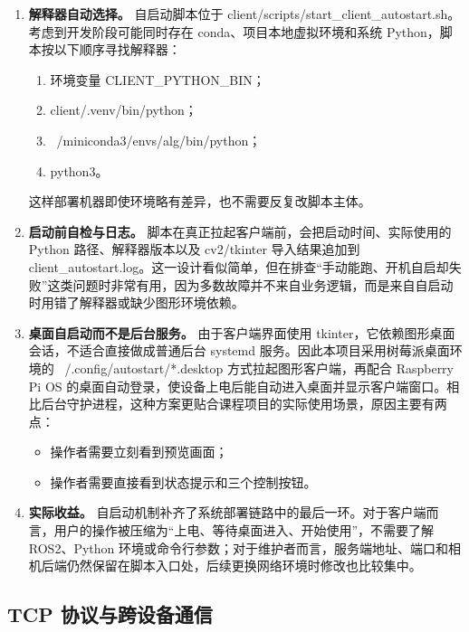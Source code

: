 \documentclass[12pt]{article}
\newcommand{\code}[1]{{\ttfamily #1}}
\begin{document}
\begin{enumerate}
	\item \textbf{解释器自动选择。} 自启动脚本位于 \code{client/scripts/start\_client\_autostart.sh}。考虑到开发阶段可能同时存在 conda、项目本地虚拟环境和系统 Python，脚本按以下顺序寻找解释器：

	      \begin{enumerate}
		      \item 环境变量 \code{CLIENT\_PYTHON\_BIN}；
		      \item \code{client/.venv/bin/python}；
		      \item \code{~/miniconda3/envs/alg/bin/python}；
		      \item \code{python3}。
	      \end{enumerate}

	      这样部署机器即使环境略有差异，也不需要反复改脚本主体。

	\item \textbf{启动前自检与日志。} 脚本在真正拉起客户端前，会把启动时间、实际使用的 Python 路径、解释器版本以及 \code{cv2}/\code{tkinter} 导入结果追加到 \code{client\_autostart.log}。这一设计看似简单，但在排查“手动能跑、开机自启却失败”这类问题时非常有用，因为多数故障并不来自业务逻辑，而是来自自启动时用错了解释器或缺少图形环境依赖。

	\item \textbf{桌面自启动而不是后台服务。} 由于客户端界面使用 \code{tkinter}，它依赖图形桌面会话，不适合直接做成普通后台 \code{systemd} 服务。因此本项目采用树莓派桌面环境的 \code{~/.config/autostart/*.desktop} 方式拉起图形客户端，再配合 Raspberry Pi OS 的桌面自动登录，使设备上电后能自动进入桌面并显示客户端窗口。相比后台守护进程，这种方案更贴合课程项目的实际使用场景，原因主要有两点：

	      \begin{itemize}
		      \item 操作者需要立刻看到预览画面；
		      \item 操作者需要直接看到状态提示和三个控制按钮。
	      \end{itemize}

	\item \textbf{实际收益。} 自启动机制补齐了系统部署链路中的最后一环。对于客户端而言，用户的操作被压缩为“上电、等待桌面进入、开始使用”，不需要了解 ROS2、Python 环境或命令行参数；对于维护者而言，服务端地址、端口和相机后端仍然保留在脚本入口处，后续更换网络环境时修改也比较集中。
\end{enumerate}

\subsection{TCP 协议与跨设备通信}
\end{document}
